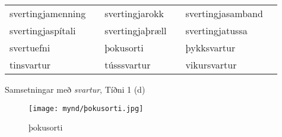 \documentclass[../samsetningasafn.tex]{subfiles}
\begin{document}
		
\begin{wordlist}[H]
\begin{tcolorbox}
	\setlength{\extrarowheight}{3pt}
	\begin{tabular}{BlBlBl}	
		svertingjamenning	& 	\phantom{ba} 	& 
		svertingjarokk		&	\phantom{ba} 	& 
		svertingjasamband	&	\phantom{ba} 	\\ 
		svertingjaspítali	&		& 
		svertingjaþræll		&		& 
		svertingjatussa	&		\\ 
		svertuefni		& 		& 
		þokusorti			&		& 
		þykksvartur		& 		\\ 
		tinsvartur			&		& 
		tússsvartur		&		& 
		vikursvartur		& 		 
	\end{tabular}
\end{tcolorbox}
	\caption{Samsetningar með \textit{svartur}, Tíðni 1 (d)}
	\label{listi:svart.1d}
\end{wordlist}	

\begin{figure}[H]
\begin{tcolorbox}
\centering
	\texttt{[image: mynd/þokusorti.jpg]}
\end{tcolorbox}
	\caption{þokusorti}
	\label{mynd:þokusorti}
\end{figure}
\end{document}
